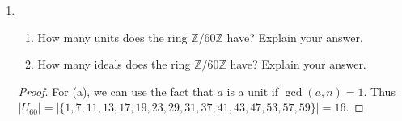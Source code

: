 \documentclass{article}
\theoremstyle{definition}
\newcommand{\Z}{\mathbb{Z}}
\newcommand{\R}{\mathbb{R}}
\newcommand{\Q}{\mathbb{Q}}
\newcommand{\x}{\times}
\newcommand{\set}[1]{\left\{#1\right\}}
\begin{document}
\begin{enumerate}
            \begin{proof}
                \begin{enumerate}
                    \item $x^4+x^2+1-1$
                    \item $2x+4$
                    \item $M_n(\Z_p)$
                    \item $\Z_7$
                    \item $GL_n(R)$
                    \item $M_n(F)$ where $F$ is the field of fractions of $\Z_p[x]$
                    \item $\set{a+b\sqrt{5}\mid a,b\in \Z}$
                    \item $\Z[x]$
                    \item $\Z\left[\frac{1}{2}(1+\sqrt(-19))\right]$ or $\Q[\sqrt{-19}]$
                    \item $\Z[i]$ is a Euclidean domain with norm $N(a+bi)=a^2+b^2$. Also $F[x]$ where $F$ is a field.
                    \item $M_n(\Z_2)$
                    \item Consider $\Z[x]$ and $P_0=(1)$, $P_1=(1,x)$, $\hdots$ , $P_n=(1,x,x^2,\hdots, x^n)$.
                    \item $(x)\subseteq \Z[x]$
                    \item Consider $\mathcal{R}\subseteq \R[x]$ consisting of polynomials with whose constant term is in $\Q$. Then $\mathcal{R}$ is a subring and $x$ is irreducible is $\mathcal{R}$. Note that $x\mid (\sqrt{2}x)^2$ but $x \nmid \sqrt{2}x$ otherwise $\sqrt{2}\in \mathcal{R}$ which would be a contradiction since $\sqrt{2}\notin \Q$. Thus $x$ is not prime.
                    \item Same as (n)
                    \item $\Z_{p^2}$
                    \item $M_n(F\x F)$ where $F$ is a field.
                \end{enumerate}
            \end{proof}
            

            \item 
                
            \begin{enumerate}
                \item How many units does the ring $\mathbb{Z}/60\mathbb{Z}$ have? Explain your answer.
                \item How many ideals does the ring $\mathbb{Z}/60\mathbb{Z}$ have? Explain your answer.
            \end{enumerate}
            \begin{proof}
                For (a), we can use the fact that $a$ is a unit if $\gcd(a,n)=1$. Thus \\ $\mid  U_{60} \mid =\mid \{1,7,11,13,17,19,23,29,31,37,41,43,47,53,57,59\}\mid =16$.


\end{proof}
\end{enumerate}
\end{document}
